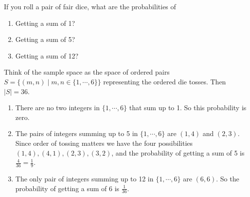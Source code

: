 \begin{prob}
If you roll a pair of fair dice, what are the probabilities of    
\begin{enumerate}[label=(\arabic*)]
\setlength\itemsep{-.2em}
    \item Getting a sum of 1?
    \item Getting a sum of 5?
    \item Getting a sum of 12?
\end{enumerate}
\end{prob}
\begin{solution}
        Think of the sample space as the space of ordered pairs $S= \{(m,n) \mid m,n \in \{1,\cdots ,6\} \} $ representing the ordered die tosses. Then $|S|=36$.
    \begin{enumerate}[label=(\arabic*)]
    \setlength\itemsep{-.2em}
        \item There are no two integers in $\{1,\cdots ,6\} $ that sum up to 1. So this probability is zero.
        \item The pairs of integers summing up to 5 in $\{1,\cdots ,6\} $ are $(1,4)$ and $(2,3)$. Since order of tossing matters we have the four possibilities $(1,4),(4,1),(2,3),(3,2)$, and the probability of getting a sum of 5 is $\frac{4}{36}=\frac{1}{9}$.
        \item The only pair of integers summing up to 12 in $\{1,\cdots ,6\} $ are $(6,6)$. So the probability of getting a sum of 6 is $\frac{1}{36}$.
    \end{enumerate}
\end{solution}


